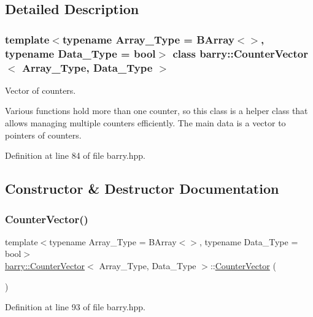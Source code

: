\subsection{Detailed Description}
\subsubsection*{template$<$typename Array\+\_\+\+Type = B\+Array$<$$>$, typename Data\+\_\+\+Type = bool$>$\newline
class barry\+::\+Counter\+Vector$<$ Array\+\_\+\+Type, Data\+\_\+\+Type $>$}

Vector of counters. 

Various functions hold more than one counter, so this class is a helper class that allows managing multiple counters efficiently. The main data is a vector to pointers of counters. 

Definition at line 84 of file barry.\+hpp.



\subsection{Constructor \& Destructor Documentation}
\mbox{\label{classbarry_1_1_counter_vector_a620e7a96ebfd05fe71da6476f27c2850}} 
\subsubsection{\texorpdfstring{Counter\+Vector()}{CounterVector()}}
{\footnotesize\ttfamily template$<$typename Array\+\_\+\+Type  = B\+Array$<$$>$, typename Data\+\_\+\+Type  = bool$>$ \\
\hyperlink{classbarry_1_1_counter_vector}{barry\+::\+Counter\+Vector}$<$ Array\+\_\+\+Type, Data\+\_\+\+Type $>$\+::\hyperlink{classbarry_1_1_counter_vector}{Counter\+Vector} (\begin{DoxyParamCaption}{ }\end{DoxyParamCaption})\hspace{0.3cm}{\ttfamily [inline]}}



Definition at line 93 of file barry.\+hpp.

\mbox{\label{classbarry_1_1_counter_vector_a6a6cfc7b9a3ff220311d312786a8e3eb}} 
